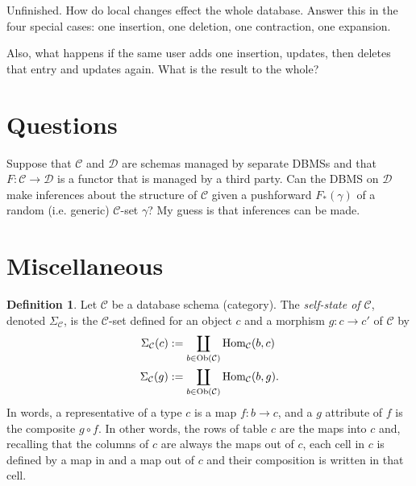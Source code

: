 \documentclass{amsart}
\def\tn{\textnormal}
\def\mc{\mathcal}
\def\Hom{\tn{Hom}}
\def\Ob{\tn{Ob}}
\def\to{\rightarrow}
\def\taking{\colon}
\def\mcC{\mc{C}}
\def\mcD{\mc{D}}
\theoremstyle{remark}
\theoremstyle{definition}
\newtheorem{definition}[theorem]{Definition}
\begin{document}
Unfinished.  How do local changes effect the whole database.  Answer this in the four special cases: one insertion, one deletion, one contraction, one expansion.

Also, what happens if the same user adds one insertion, updates, then deletes that entry and updates again.  What is the result to the whole?

\section{Questions}

Suppose that $\mcC$ and $\mcD$ are schemas managed by separate DBMSs and that $F\taking\mcC\to\mcD$ is a functor that is managed by a third party.  Can the DBMS on $\mcD$ make inferences about the structure of $\mcC$ given a pushforward $F_*(\gamma)$ of a random (i.e. generic) $\mcC$-set $\gamma$?  My guess is that inferences can be made.

\section{Miscellaneous} 

\begin{definition}

Let $\mcC$ be a database schema (category).  The {\em self-state of $\mcC$}, denoted $\Sigma_\mcC$, is the $\mcC$-set defined for an object $c$ and a morphism $g\taking c\to c'$ of $\mcC$ by \begin{align*}\Sigma_\mcC(c)&:=\coprod_{b\in\Ob(\mcC)}\Hom_\mcC(b,c)\\\Sigma_\mcC(g)&:=\coprod_{b\in\Ob(\mcC)}\Hom_\mcC(b,g).\end{align*}  In words, a representative of a type $c$ is a map $f\taking b\to c$, and a $g$ attribute of $f$ is the composite $g\circ f$.  In other words, the rows of table $c$ are the maps into $c$ and, recalling that the columns of $c$ are always the maps out of $c$, each cell in $c$ is defined by a map in and a map out of $c$ and their composition is written in that cell.

\end{definition}
\end{document}
